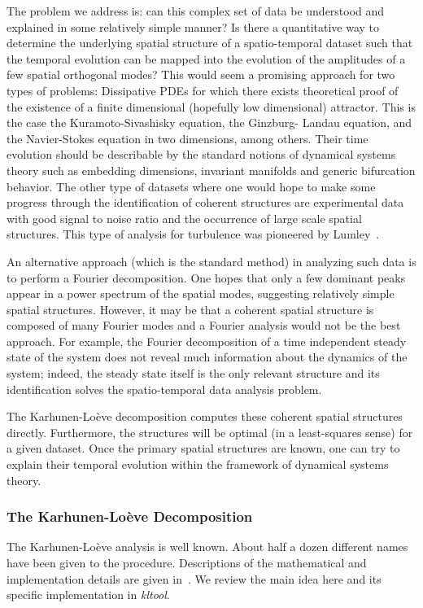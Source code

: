 The problem we address is: can this complex set of data be understood and
explained in some relatively simple manner?  Is there a quantitative 
way to determine the underlying spatial structure of a spatio-temporal
dataset such that the temporal evolution can be mapped into the
evolution of the amplitudes of a few spatial orthogonal modes?
This would seem a promising approach for two types of problems:
Dissipative PDEs for which there exists theoretical proof of the 
existence of a finite dimensional (hopefully low dimensional) attractor.
This is the case the Kuramoto-Sivashisky equation, the Ginzburg-
Landau equation, and the Navier-Stokes equation in two dimensions,
among others.  Their time evolution
should be describable by the standard notions of dynamical systems
theory such as embedding dimensions, invariant manifolds and
generic bifurcation behavior. The other type of datasets where one 
would hope to make some progress through the identification of
coherent structures are experimental data with good signal to noise
ratio and the occurrence of large scale spatial structures. This type of
analysis for turbulence was pioneered by Lumley~\cite{lum}.

An alternative approach (which is the standard method)
in analyzing such data is to perform a Fourier
decomposition.  One hopes that only a few dominant peaks appear
in a power spectrum of the spatial modes, suggesting relatively simple 
spatial structures.
However, it may be that a coherent spatial structure is 
composed of many Fourier modes
and a Fourier analysis would not be the best approach.
For example, the Fourier decomposition of a time independent steady state
of the system does not reveal much information about the dynamics
of the system; indeed, the steady state itself is the only relevant
structure and its identification solves the spatio-temporal data analysis
problem. 

The Karhunen-Lo\`{e}ve decomposition computes these coherent
spatial structures directly.
Furthermore, the structures will be optimal (in a least-squares sense)
for a given dataset.
Once the primary spatial structures are known, one can try to
explain their temporal evolution within the framework of
dynamical systems theory.

\subsubsection{The Karhunen-Lo\`{e}ve Decomposition}
The Karhunen-Lo\`{e}ve analysis is well known.  About half a dozen
different names have been given to the procedure.  Descriptions
of the mathematical and implementation details are given
in~\cite{sir,pre,ber}. We review the main idea here
and its specific implementation in {\sl kltool}.

